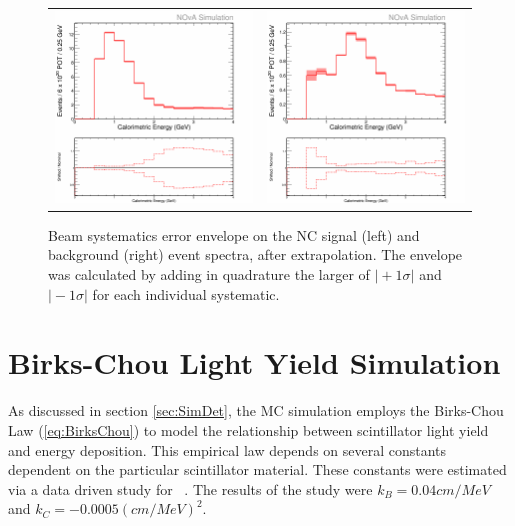 \begin{figure}[htb]
  \centering
  \begin{tabular}{c c}
    \includegraphics[width=.47\textwidth]{figures/Systs/cNCEXBeamSysts.png} &
    \includegraphics[width=.47\textwidth]{figures/Systs/cBGEXBeamSysts.png} \\
  \end{tabular}
  \caption[Beam Systematic Error Envelopes]{Beam systematics error envelope on the NC signal (left) and background (right) event spectra, after extrapolation. The envelope was calculated by adding in quadrature the larger of $\vert +1\sigma \vert$ and $\vert -1\sigma \vert$ for each individual systematic.}
  \label{fig:SystBeam}
\end{figure}

\section{Birks-Chou Light Yield Simulation}

As discussed in section \ref{sec:SimDet}, the MC simulation employs the Birks-Chou Law (\ref{eq:BirksChou}) to model the relationship between scintillator light yield and energy deposition. This empirical law depends on several constants dependent on the particular scintillator material. These constants were estimated via a data driven study for \nova~\cite{ref:DanBirks}. The results of the study were $k_B = 0.04\unit{cm/MeV}$ and $k_C = -0.0005\unit{(cm/MeV)}^2$.

